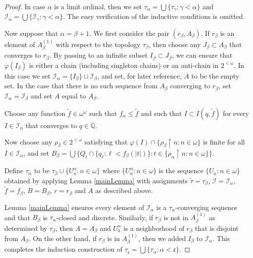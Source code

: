 \documentclass{amsart}
\theoremstyle{definition}
\theoremstyle{remark}
\begin{document}
\begin{proof}
In case $\alpha$ is a limit ordinal, then we set
 $\tau_\alpha = \bigcup \{ \tau_\gamma : \gamma < \alpha\}$
 and $\mathcal I_\alpha = \bigcup\{ \mathcal I_\gamma :\gamma < \alpha\}$.
 The easy verification of the inductive conditions is omitted. 
 \medskip

 Now suppose that $\alpha = \beta+1$. We first consider 
 the pair $(r_\beta, A_\beta)$. If $r_\beta$ is an element
 of $A_\beta^{(1)}$ with respect to the topology $\tau_\beta$,
  then choose any $J_\beta\subset A_\beta$ that converges
  to $r_\beta$. By passing to an infinite subset $I_\beta\subset
   J_\beta$, we can ensure that $\varphi(I_\beta)$ is either
   a chain (including singleton chains) or an anti-chain in $2^{<\omega}$. 
In this case we set $\mathcal I_{\alpha}=\{I_\beta\}\cup\mathcal I_\beta$,
and set, for later reference, $A$ to be the empty set. 
In the case that there is no such sequence from $A_\beta$ converging
to $r_\beta$, set $\mathcal I_\alpha=\mathcal I_\beta$ and 
set $A$ equal to $A_\beta$. 

Choose any function $\tilde f\in \omega^\omega$ such that
 $f_\alpha \leq \tilde f$  and such that $I\subset I(q,\tilde f)$
 for every $I\in \mathcal I_\alpha$ that converges to $q\in \mathbb Q$.

Now choose any $\rho_\beta\in 2^{<\omega}$ satisfying that
   $\varphi(I)\cap \{ \rho_\beta\restriction n : n\in\omega\}$
   is finite for all $I\in \mathcal I_\alpha$, and
   set $B_\beta  
 = \bigcup\{ Q_t \cap \{ q_\ell : \ell < f_\beta(|t|) \}: 
  t\in \{ \rho_\alpha\restriction n : n\in \omega\}\}$.

  Define $\tau_\alpha $ to be $\tau_\beta\cup \{ U^\alpha_n : n\in\omega\}$
   where $\{ U^\alpha_n : n\in\omega\}$ is the sequence
    $\{ U_n : n\in\omega\}$ obtained by applying
    Lemma \ref{mainLemma} with assignments
     $\tilde \tau =\tau_\beta$, $\mathcal I = \mathcal I_\alpha$,
     $\tilde f = f_\beta$,
     $B= B_\beta$,  $r=r_\beta$
     and $A$ as described above.

    Lemma \ref{mainLemma} ensures every element
    of $\mathcal I_\alpha$ is a $\tau_\alpha$-converging
    sequence
    and that $B_\beta$ is $\tau_\alpha$-closed and discrete. 
    Similarly, if $r_\beta$ is not in $A_\beta^{(1)}$ as 
    determined by $\tau_\beta$, then $A=A_\beta$ and
     $U^\alpha_0$ is a neighborhood of $r_\beta$ that
     is disjoint from $A_\beta$. On the other hand,
     if $r_\beta$ is in $A_\beta^{(1)}$, then
      we added $I_\beta$ to $\mathcal I_\alpha$.
This completes the induction construction of 
$\tau_{\mathfrak c} = \bigcup\{ \tau_\alpha : \alpha < \mathfrak c\}$.


\end{proof}
\end{document}
